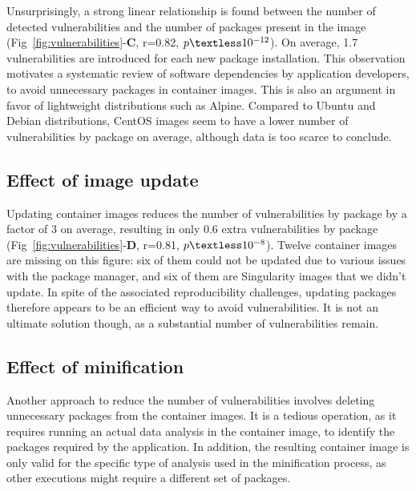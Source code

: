 \documentclass[a4paper,num-refs]{oup-contemporary}
\newcommand{\change}[2]{\color{cyan}Changes: #1\color{black}}
\begin{document}
Unsurprisingly, a strong linear relationship is found between the number of
detected vulnerabilities and the number of packages present in the
image (Fig~\ref{fig:vulnerabilities}-\textbf{C}, r=0.82,
$p\textless10^{-12}$). On average, 1.7 vulnerabilities are introduced for
each new package installation. This observation motivates a systematic
review of software dependencies by application developers, to avoid
unnecessary packages in container images. This is also an argument in favor of lightweight
distributions such as Alpine. Compared to Ubuntu and Debian distributions,
CentOS images seem to have a lower number of vulnerabilities by package on
average, although data is too scarce to conclude.

\subsection{Effect of image update}

Updating container images reduces the number of vulnerabilities by package
by a factor of 3 on average, resulting in only 0.6 extra vulnerabilities by
package (Fig~\ref{fig:vulnerabilities}-\textbf{D}, r=0.81,
$p\textless10^{-8}$). Twelve container images are missing on this figure:
six of them could not be updated due to various issues with the package
manager, and six of them are Singularity images that we didn't update.
In spite of the associated reproducibility challenges, updating
packages therefore appears to be an efficient way to avoid vulnerabilities. It
is not an ultimate solution though, as a substantial number of
vulnerabilities remain.

\subsection{Effect of minification}

Another approach to reduce the number of vulnerabilities involves deleting
unnecessary packages from the container images. It is a tedious operation,
as it requires running an actual data analysis in the container image, to
identify the packages required by the application. In addition, the
resulting container image is only valid for the specific type of analysis
used in the minification process, as other executions might require a
different set of packages. 
\end{document}
